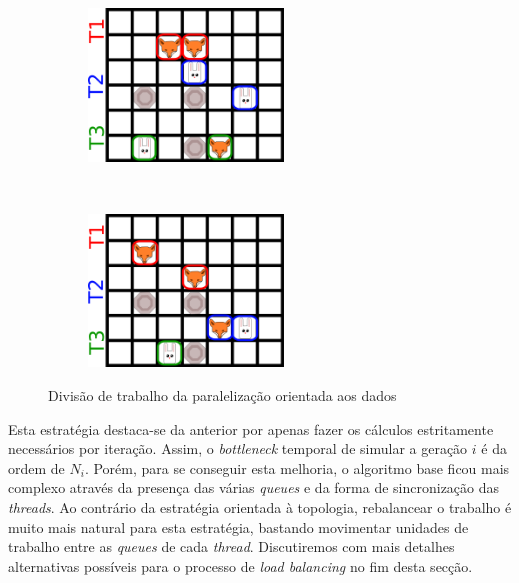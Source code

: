 \documentclass[10pt,a4paper,oneside]{article}
\begin{document}
\begin{figure}[H]
    \centering
    \begin{subfigure}[b]{0.4\textwidth}
      \centering
      \includegraphics[height=1.6in]{grid1_par2.png}
    \end{subfigure}
    ~
    \begin{subfigure}[b]{0.4\textwidth}
      \centering
      \includegraphics[height=1.6in]{grid2_par2.png}
    \end{subfigure}
    \caption{Divisão de trabalho da paralelização orientada aos dados}
    \label{fig:par2}
\end{figure}

Esta estratégia destaca-se da anterior por apenas fazer os cálculos
estritamente necessários por iteração. Assim, o \textit{bottleneck}
temporal de simular a geração $i$ é da ordem de $N_i$. Porém, para se
conseguir esta melhoria, o algoritmo base ficou mais complexo através
da presença das várias \textit{queues} e da forma de sincronização das
\textit{threads}. Ao contrário da estratégia orientada à topologia,
rebalancear o trabalho é muito mais natural para esta estratégia,
bastando movimentar unidades de trabalho entre as \textit{queues} de
cada \textit{thread}. Discutiremos com mais detalhes alternativas
possíveis para o processo de \textit{load balancing} no fim desta
secção.
\end{document}
